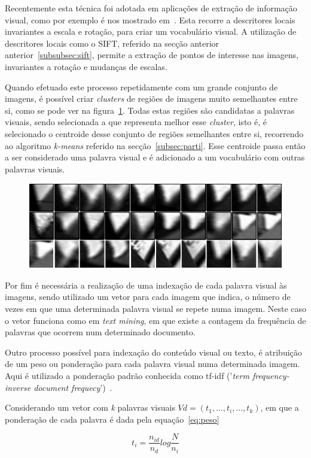 Recentemente esta técnica foi adotada em aplicações de extração de informação visual, como por exemplo é nos mostrado em~\cite{Sivic2003, Sivic2006}. Esta recorre a descritores locais invariantes a escala e rotação, para criar um vocabulário visual. A utilização de descritores locais como o SIFT, referido na secção anterior anterior~\ref{subsubsec:sift}, permite a extração de pontos de interesse nas imagens, invariantes a rotação e mudanças de escalas.

Quando efetuado este processo repetidamente com um grande conjunto de imagens, é possível criar \textit{clusters} de regiões de imagens muito semelhantes entre si, como se pode ver na figura~\ref{fig:visualword}. Todas estas regiões são candidatas a palavras visuais, sendo selecionada a que representa melhor esse \textit{cluster}, isto é, é selecionado o centroide desse conjunto de regiões semelhantes entre si, recorrendo ao algoritmo \textit{k-means} referido na secção~\ref{subsec:parti}. Esse centroide passa então a ser considerado uma palavra visual e é adicionado a um vocabulário com outras palavras visuais.

\begin{figure}[h]
\centering
\includegraphics[width=0.4\linewidth]{./figures/visual_word_1}
\label{fig:visualword}
\end{figure}

Por fim é necessária a realização de uma indexação de cada palavra visual às imagens, sendo utilizado um vetor para cada imagem que indica, o número de vezes em que uma determinada palavra visual se repete numa imagem. Neste caso o vetor funciona como em \textit{text mining}, em que existe a contagem da frequência de palavras que ocorrem num determinado documento.

Outro processo possível para indexação do conteúdo visual ou texto, é atribuição de um peso ou ponderação para cada palavra visual numa determinada imagem. Aqui é utilizado a ponderação padrão conhecida como tf-idf ('\textit{term frequency-inverse document frequecy}')~\cite{Sivic2003}. 

Considerando um vetor com \textit{k} palavras visuais $Vd = (t_{1},...,t_{i},...,t_{k})$, em que a ponderação de cada palavra é dada pela equação~\ref{eq:peso}

\begin{equation}
t_{i} = \frac{n_{id}}{n_{d}}log\frac{N}{n_{i}}
\label{eq:peso}
\end{equation}


